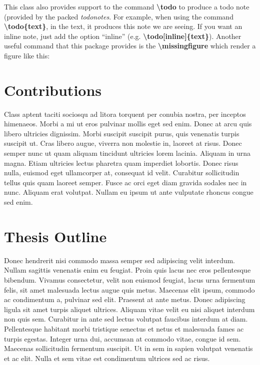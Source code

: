 This class also provides support to the command \textbf{\textbackslash{todo}} to produce a todo note (provided by the packed \textit{todonotes}. For example, when using the command \textbf{\textbackslash{todo}\{text\}}, in the text, it produces this note  we are seeing. If you want an inline note, just add the option ``inline'' (e.g. \textbf{\textbackslash{todo}[inline]\{text\}}). Another useful command that this package provides is the \textbf{\textbackslash{missingfigure}} which render a figure like this:

\begin{center}
\end{center}

\section{Contributions}\label{chap:introduction:contributions}

Class aptent taciti sociosqu ad litora torquent per conubia nostra, per inceptos himenaeos. Morbi a mi ut eros pulvinar mollis eget sed enim. Donec at arcu quis libero ultricies dignissim. Morbi suscipit suscipit purus, quis venenatis turpis suscipit ut. Cras libero augue, viverra non molestie in, laoreet at risus. Donec semper nunc ut quam aliquam tincidunt ultricies lorem lacinia. Aliquam in urna magna. Etiam ultricies lectus pharetra quam imperdiet lobortis. Donec risus nulla, euismod eget ullamcorper at, consequat id velit. Curabitur sollicitudin tellus quis quam laoreet semper. Fusce ac orci eget diam gravida sodales nec in nunc. Aliquam erat volutpat. Nullam eu ipsum ut ante vulputate rhoncus congue sed enim.

\section{Thesis Outline}\label{chap:introduction:outline}

Donec hendrerit nisi commodo massa semper sed adipiscing velit interdum. Nullam sagittis venenatis enim eu feugiat. Proin quis lacus nec eros pellentesque bibendum. Vivamus consectetur, velit non euismod feugiat, lacus urna fermentum felis, sit amet malesuada lectus augue quis metus. Maecenas elit ipsum, commodo ac condimentum a, pulvinar sed elit. Praesent at ante metus. Donec adipiscing ligula sit amet turpis aliquet ultrices. Aliquam vitae velit eu nisi aliquet interdum non quis sem. Curabitur in ante sed lectus volutpat faucibus interdum at diam. Pellentesque habitant morbi tristique senectus et netus et malesuada fames ac turpis egestas. Integer urna dui, accumsan at commodo vitae, congue id sem. Maecenas sollicitudin fermentum suscipit. Ut in sem in sapien volutpat venenatis et ac elit. Nulla et sem vitae est condimentum ultrices sed ac risus.
